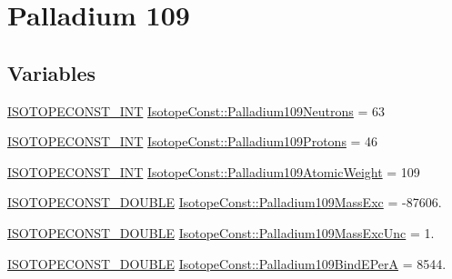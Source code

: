 \hypertarget{group___isotope_const-_palladium-_pd109}{}\section{Palladium 109}
\label{group___isotope_const-_palladium-_pd109}
\subsection*{Variables}
\begin{DoxyCompactItemize}
\item 
\mbox{\hyperlink{group___isotope_const-_macros_ga5f18360b3e99483a35c32d789e62621c}{I\+S\+O\+T\+O\+P\+E\+C\+O\+N\+S\+T\+\_\+\+I\+NT}} \mbox{\hyperlink{group___isotope_const-_palladium-_pd109_ga9bf6c326c3f4e1c31c985fc0b7a30a86}{Isotope\+Const\+::\+Palladium109\+Neutrons}} = 63
\item 
\mbox{\hyperlink{group___isotope_const-_macros_ga5f18360b3e99483a35c32d789e62621c}{I\+S\+O\+T\+O\+P\+E\+C\+O\+N\+S\+T\+\_\+\+I\+NT}} \mbox{\hyperlink{group___isotope_const-_palladium-_pd109_ga1af55f224526a0639d94bea9c572cdf7}{Isotope\+Const\+::\+Palladium109\+Protons}} = 46
\item 
\mbox{\hyperlink{group___isotope_const-_macros_ga5f18360b3e99483a35c32d789e62621c}{I\+S\+O\+T\+O\+P\+E\+C\+O\+N\+S\+T\+\_\+\+I\+NT}} \mbox{\hyperlink{group___isotope_const-_palladium-_pd109_gaf32892da5b3009e0ff81947918723508}{Isotope\+Const\+::\+Palladium109\+Atomic\+Weight}} = 109
\item 
\mbox{\hyperlink{group___isotope_const-_macros_ga8f45a7272ce02c0b4c65c44636ed719a}{I\+S\+O\+T\+O\+P\+E\+C\+O\+N\+S\+T\+\_\+\+D\+O\+U\+B\+LE}} \mbox{\hyperlink{group___isotope_const-_palladium-_pd109_ga93f66f37f5b138a3b4503f09e0d504a3}{Isotope\+Const\+::\+Palladium109\+Mass\+Exc}} = -\/87606.
\item 
\mbox{\hyperlink{group___isotope_const-_macros_ga8f45a7272ce02c0b4c65c44636ed719a}{I\+S\+O\+T\+O\+P\+E\+C\+O\+N\+S\+T\+\_\+\+D\+O\+U\+B\+LE}} \mbox{\hyperlink{group___isotope_const-_palladium-_pd109_gacf0a0dca6d6cc215987e85f1b2c80afe}{Isotope\+Const\+::\+Palladium109\+Mass\+Exc\+Unc}} = 1.
\item 
\mbox{\hyperlink{group___isotope_const-_macros_ga8f45a7272ce02c0b4c65c44636ed719a}{I\+S\+O\+T\+O\+P\+E\+C\+O\+N\+S\+T\+\_\+\+D\+O\+U\+B\+LE}} \mbox{\hyperlink{group___isotope_const-_palladium-_pd109_ga79092d0ce8a660b476b8d1d815e99e42}{Isotope\+Const\+::\+Palladium109\+Bind\+E\+PerA}} = 8544.
\item 

\end{DoxyCompactItemize}
